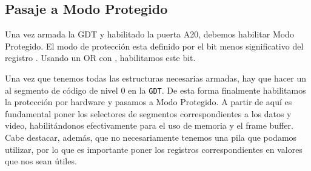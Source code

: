 \subsection{Pasaje a Modo Protegido}

Una vez armada la GDT y habilitado la puerta A20, debemos habilitar Modo Protegido. El modo de protección esta definido por el bit menos significativo del registro . Usando un OR con , habilitamos este bit.

Una vez que tenemos todas las estructuras necesarias armadas, hay que hacer un  al segmento de código de nivel 0 en la \texttt{GDT}. De esta forma finalmente habilitamos la protección por hardware y pasamos a Modo Protegido. A partir de aquí es fundamental poner los selectores de segmentos correspondientes a los datos y video, habilitándonos efectivamente para el uso de memoria y el frame buffer. Cabe destacar, además, que no necesariamente tenemos una pila que podamos utilizar, por lo que es importante poner los registros correspondientes en valores que nos sean útiles.